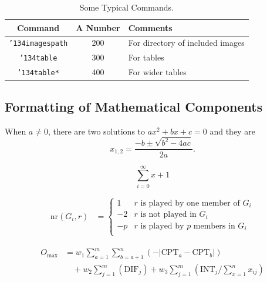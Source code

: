 \documentclass[article,english]{stucosrec}
\begin{document}
	\begin{table}
		\centering
		\caption{Some Typical Commands.}
		\label{tab:table2}
		\begin{tabular}{|c|c|l|} \hline
			Command&A Number&Comments\\ \hline
			\texttt{{\char'134}imagespath} & 200 & For directory of included images \\ \hline
			\texttt{{\char'134}table} & 300 & For tables\\ \hline
			\texttt{{\char'134}table*} & 400& For wider tables\\ \hline
		\end{tabular}
	\end{table}
    
    \subsection{Formatting of Mathematical Components}
    
    When $a \ne 0$, there are two solutions to $ax^2 + bx + c = 0$ and they are $$x_{1, 2} = \frac{-b \pm \sqrt{b^2-4ac}}{2a}.$$
    
    \begin{displaymath}\sum_{i=0}^{\infty} x + 1\end{displaymath}
    
    \begin{equation}
		\begin{aligned} 
			\mathrm{nr}(G_i,r) & = \label{equ:yannibel}
			\begin{cases}
				1  & \text{$r$ is played by one member of $G_i$}\\
				-2 & \text{$r$ is not played in $G_i$} \\
				-p & \text{$r$ is played by $p$ members in $G_i$}\\
			\end{cases}
		\end{aligned}
	\end{equation}
	
	\begin{equation}
		\begin{aligned}
			O_{\max}& = w_1 \sum_{a=1}^{m} \sum_{b=a+1}^{n} (-\lvert\text{CPT}_a 
			-\text{CPT}_b\rvert)\\ 
			&\quad + w_2 \sum_{j=1}^{m} (\text{DIF}_j) + w_3 \sum_{j=1}^{m} 
			(\text{INT}_j/\sum_{x=1}^{n} x_{ij})
		\end{aligned}
		\label{equ:ho}
	\end{equation}
    
\end{document}
